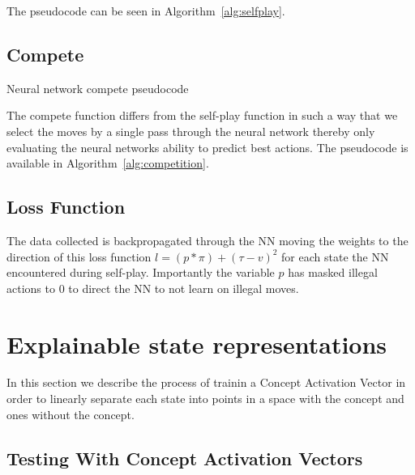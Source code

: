 The pseudocode can be seen in Algorithm~\ref{alg:selfplay}.

\subsection{Compete}

\begin{algorithm}[t]
\caption{Neural network compete pseudocode}
\label{alg:competition}
\begin{algorithmic}[1]
    \ENDWHILE
    \ENDIF
\ENDFOR
{}
\end{algorithmic}
\end{algorithm}

The compete function differs from the self-play function in such a way that we select the moves by a single pass through the neural network thereby only evaluating the neural networks ability to predict best actions. The pseudocode is available in Algorithm~\ref{alg:competition}.

\subsection{Loss Function}

The data collected is backpropagated through the NN moving the weights to the direction of this loss function $l = (p * \pi) + (\tau - v)^2$ for each state the NN encountered during self-play. Importantly the variable $p$ has masked illegal actions to $0$ to direct the NN to not learn on illegal moves.

\section{Explainable state representations}

In this section we describe the process of trainin a Concept Activation Vector in order to linearly separate each state into points in a space with the concept and ones without the concept.

\subsection{Testing With Concept Activation Vectors}

